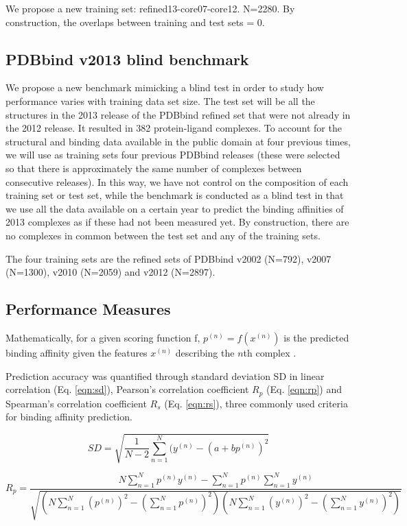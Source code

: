 \documentclass[journal=jacsat,manuscript=article]{achemso}
\begin{document}
We propose a new training set: refined13-core07-core12. N=2280. By construction, the overlaps between training and test sets = 0.%

\subsection{PDBbind v2013 blind benchmark}

We propose a new benchmark mimicking a blind test in order to study how performance varies with training data set size. The test set will be all the structures in the 2013 release of the PDBbind refined set that were not already in the 2012 release. It resulted in 382 protein-ligand complexes. To account for the structural and binding data available in the public domain at four previous times, we will use as training sets four previous PDBbind releases (these were selected so that there is approximately the same number of complexes between consecutive releases). In this way, we have not control on the composition of each training set or test set, while the benchmark is conducted as a blind test in that we use all the data available on a certain year to predict the binding affinities of 2013 complexes as if these had not been measured yet. By construction, there are no complexes in common between the test set and any of the training sets. 

The four training sets are the refined sets of PDBbind v2002 (N=792), v2007 (N=1300), v2010 (N=2059) and v2012 (N=2897).

\subsection{Performance Measures}

Mathematically, for a given scoring function f, $p^{(n)}=f(x^{(n)})$ is the predicted binding affinity given the features $x^{(n)}$ describing the $n$th complex .

Prediction accuracy was quantified through standard deviation SD in linear correlation (Eq. \ref{eqn:sd}), Pearson's correlation coefficient $R_p$ (Eq. \ref{eqn:rp}) and Spearman's correlation coefficient $R_s$ (Eq. \ref{eqn:rs}), three commonly used criteria for binding affinity prediction.

\begin{equation}
SD = \sqrt{\frac{1}{N-2}\sum_{n=1}^N(y^{(n)}-(a+bp^{(n)})^2}
\label{eqn:sd}
\end{equation}

\begin{equation}
R_p = \frac{N\sum_{n=1}^Np^{(n)}y^{(n)}-\sum_{n=1}^Np^{(n)}\sum_{n=1}^Ny^{(n)}}{\sqrt{(N\sum_{n=1}^N(p^{(n)})^2-(\sum_{n=1}^Np^{(n)})^2)(N\sum_{n=1}^N(y^{(n)})^2-(\sum_{n=1}^Ny^{(n)})^2)}}
\label{eqn:rp}
\end{equation}
\end{document}
